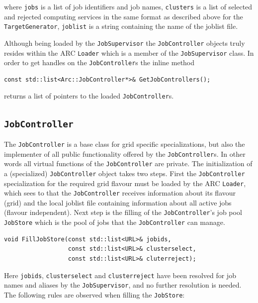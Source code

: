 \documentclass{book}
\newcommand{\JobController}{\texttt{JobController}}
\newcommand{\JobSupervisor}{\texttt{JobSupervisor}}
\newcommand{\Loader}{\texttt{Loader}}
\newcommand{\TargetGenerator}{\texttt{TargetGenerator}}
\begin{document}
where \texttt{jobs} is a list of job identifiers and job names,
\texttt{clusters} is a list of selected and rejected computing
services in the same format as described above for the
{\TargetGenerator}, \texttt{joblist} is a string containing the name
of the joblist file.

Although being loaded by the {\JobSupervisor} the {\JobController}
objects truly resides within the ARC {\Loader} which is a member of
the {\JobSupervisor} class. In order to get handles on the
{\JobController}s the inline method

\begin{shaded}
\begin{verbatim}
const std::list<Arc::JobController*>& GetJobControllers();
\end{verbatim}
\end{shaded}

returns a list of pointers to the loaded {\JobController}s.

\subsection{{\JobController}}

The {\JobController} is a base class for grid specific
specializations, but also the implementer of all public functionality
offered by the {\JobController}s. In other words all virtual functions
of the {\JobController} are private. The initialization of a
(specialized) {\JobController} object takes two steps. First the
{\JobController} specialization for the required grid flavour must be
loaded by the ARC {\Loader}, which sees to that the {\JobController}
receives information about its flavour (grid) and the local joblist
file containing information about all active jobs (flavour
independent). Next step is the filling of the {\JobController}'s job
pool \texttt{JobStore} which is the pool of jobs that the
{\JobController} can manage.

\begin{shaded}
\begin{verbatim}
void FillJobStore(const std::list<URL>& jobids,
                  const std::list<URL>& clusterselect,
                  const std::list<URL>& cluterreject);
\end{verbatim}
\end{shaded}

Here \texttt{jobids}, \texttt{clusterselect} and
\texttt{clusterreject} have been resolved for job names and aliases by
the {\JobSupervisor}, and no further resolution is needed. The
following rules are observed when filling the \texttt{JobStore}:
\end{document}
